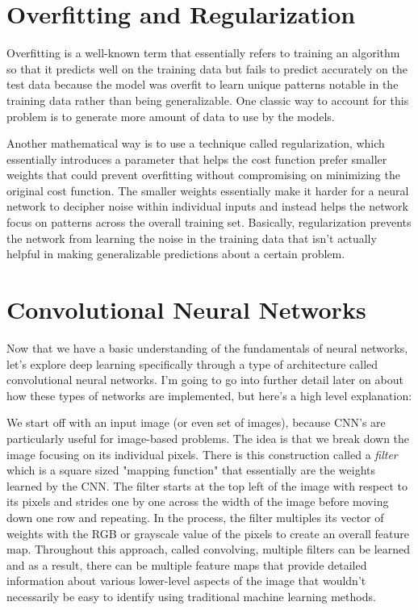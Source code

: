 \documentclass[11pt]{article}
\theoremstyle{definition}
\begin{document}
\section{Overfitting and Regularization}
Overfitting is a well-known term that essentially refers to training an algorithm so that it predicts well on the training data but fails to predict accurately on the test data because the model was overfit to learn unique patterns notable in the training data rather than being generalizable. One classic way to account for this problem is to generate more amount of data to use by the models.

Another mathematical way is to use a technique called regularization, which essentially introduces a parameter that helps the cost function prefer smaller weights that could prevent overfitting without compromising on minimizing the original cost function. The smaller weights essentially make it harder for a neural network to decipher noise within individual inputs and instead helps the network focus on patterns across the overall training set. Basically, regularization prevents the network from learning the noise in the training data that isn't actually helpful in making generalizable predictions about a certain problem.

\section{Convolutional Neural Networks}
Now that we have a basic understanding of the fundamentals of neural networks, let's explore deep learning specifically through a type of architecture called convolutional neural networks. I'm going to go into further detail later on about how these types of networks are implemented, but here's a high level explanation:

We start off with an input image (or even set of images), because CNN's are particularly useful for image-based problems. The idea is that we break down the image focusing on its individual pixels. There is this construction called a \textit{filter} which is a  square sized "mapping function" that essentially are the weights learned by the CNN. The filter starts at the top left of the image with respect to its pixels and strides one by one across the width of the image before moving down one row and repeating. In the process, the filter multiples its vector of weights with the RGB or grayscale value of the pixels to create an overall feature map. Throughout this approach, called convolving, multiple filters can be learned and as a result, there can be multiple feature maps that provide detailed information about various lower-level aspects of the image that wouldn't necessarily be easy to identify using traditional machine learning methods.
\end{document}

